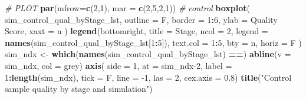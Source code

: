 \documentclass[
]{book}
\newenvironment{Shaded}{\begin{snugshade}}{\end{snugshade}}
\newcommand{\CommentTok}[1]{\textcolor[rgb]{0.56,0.35,0.01}{\textit{#1}}}
\newcommand{\DataTypeTok}[1]{\textcolor[rgb]{0.13,0.29,0.53}{#1}}
\newcommand{\DecValTok}[1]{\textcolor[rgb]{0.00,0.00,0.81}{#1}}
\newcommand{\FloatTok}[1]{\textcolor[rgb]{0.00,0.00,0.81}{#1}}
\newcommand{\KeywordTok}[1]{\textcolor[rgb]{0.13,0.29,0.53}{\textbf{#1}}}
\newcommand{\NormalTok}[1]{#1}
\newcommand{\OperatorTok}[1]{\textcolor[rgb]{0.81,0.36,0.00}{\textbf{#1}}}
\newcommand{\StringTok}[1]{\textcolor[rgb]{0.31,0.60,0.02}{#1}}
\begin{document}
\begin{Shaded}
\begin{Highlighting}[]
\CommentTok{\# PLOT}
\KeywordTok{par}\NormalTok{(}\DataTypeTok{mfrow=}\KeywordTok{c}\NormalTok{(}\DecValTok{2}\NormalTok{,}\DecValTok{1}\NormalTok{), }\DataTypeTok{mar =} \KeywordTok{c}\NormalTok{(}\DecValTok{2}\NormalTok{,}\DecValTok{5}\NormalTok{,}\DecValTok{2}\NormalTok{,}\DecValTok{1}\NormalTok{))}
\CommentTok{\# control}
\KeywordTok{boxplot}\NormalTok{(}
\NormalTok{  sim\_control\_qual\_byStage\_lst, }
  \DataTypeTok{outline =}\NormalTok{ F, }
  \DataTypeTok{border =} \DecValTok{1}\OperatorTok{:}\DecValTok{6}\NormalTok{,}
  \DataTypeTok{ylab =} \StringTok{\textquotesingle{}Quality Score\textquotesingle{}}\NormalTok{,}
  \DataTypeTok{xaxt =} \StringTok{\textquotesingle{}n\textquotesingle{}}
\NormalTok{)}
\KeywordTok{legend}\NormalTok{(}\StringTok{\textquotesingle{}bottomright\textquotesingle{}}\NormalTok{, }\DataTypeTok{title =} \StringTok{\textquotesingle{}Stage\textquotesingle{}}\NormalTok{, }\DataTypeTok{ncol =} \DecValTok{2}\NormalTok{,}
 \DataTypeTok{legend =} \KeywordTok{names}\NormalTok{(sim\_control\_qual\_byStage\_lst[}\DecValTok{1}\OperatorTok{:}\DecValTok{5}\NormalTok{]), }
 \DataTypeTok{text.col =} \DecValTok{1}\OperatorTok{:}\DecValTok{5}\NormalTok{,}
 \DataTypeTok{bty =} \StringTok{\textquotesingle{}n\textquotesingle{}}\NormalTok{, }\DataTypeTok{horiz =}\NormalTok{ F}
\NormalTok{)}
\NormalTok{sim\_ndx <{-}}\StringTok{ }\KeywordTok{which}\NormalTok{(}\KeywordTok{names}\NormalTok{(sim\_control\_qual\_byStage\_lst) }\OperatorTok{==}\StringTok{\textquotesingle{}\textquotesingle{}}\NormalTok{)}
\KeywordTok{abline}\NormalTok{(}\DataTypeTok{v =}\NormalTok{ sim\_ndx, }\DataTypeTok{col =} \StringTok{\textquotesingle{}grey\textquotesingle{}}\NormalTok{)}
\KeywordTok{axis}\NormalTok{(}
  \DataTypeTok{side =} \DecValTok{1}\NormalTok{, }
  \DataTypeTok{at =}\NormalTok{ sim\_ndx}\DecValTok{{-}2}\NormalTok{, }
  \DataTypeTok{label =} \DecValTok{1}\OperatorTok{:}\KeywordTok{length}\NormalTok{(sim\_ndx),}
  \DataTypeTok{tick =}\NormalTok{ F, }
  \DataTypeTok{line =} \DecValTok{{-}1}\NormalTok{, }\DataTypeTok{las =} \DecValTok{2}\NormalTok{,}
  \DataTypeTok{cex.axis =} \FloatTok{0.8}\NormalTok{)}
\KeywordTok{title}\NormalTok{(}\StringTok{"Control sample quality by stage and simulation"}\NormalTok{)}


\end{Highlighting}
\end{Shaded}
\end{document}
